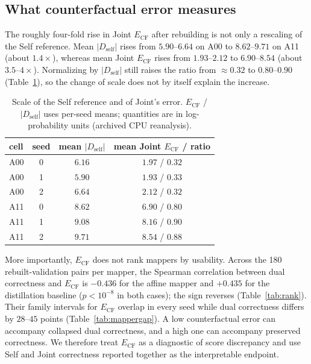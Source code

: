 \documentclass[11pt,twocolumn]{article}
\begin{document}
\subsection{What counterfactual error measures}
\label{sec:metricvalid}

The roughly four-fold rise in Joint $E_{\mathrm{CF}}$ after rebuilding is not
only a rescaling of the Self reference. Mean $|D_{\mathrm{self}}|$ rises from
$5.90$--$6.64$ on A00 to $8.62$--$9.71$ on A11 (about $1.4\times$), whereas mean
Joint $E_{\mathrm{CF}}$ rises from $1.93$--$2.12$ to $6.90$--$8.54$ (about
$3.5$--$4\times$). Normalizing by $|D_{\mathrm{self}}|$ still raises the ratio
from $\approx0.32$ to $0.80$--$0.90$ (Table~\ref{tab:scale}), so the change of
scale does not by itself explain the increase.

\begin{table}[t]
\centering
\caption{Scale of the Self reference and of Joint's error. $E_{\mathrm{CF}}$ /
$|D_{\mathrm{self}}|$ uses per-seed means; quantities are in log-probability
units (archived CPU reanalysis).}
\label{tab:scale}
\begin{tabular}{lccc}
\toprule
cell & seed & mean $|D_{\mathrm{self}}|$ & mean Joint $E_{\mathrm{CF}}$ / ratio \\
\midrule
A00 & 0 & $6.16$ & $1.97$ / $0.32$ \\
A00 & 1 & $5.90$ & $1.93$ / $0.33$ \\
A00 & 2 & $6.64$ & $2.12$ / $0.32$ \\
A11 & 0 & $8.62$ & $6.90$ / $0.80$ \\
A11 & 1 & $9.08$ & $8.16$ / $0.90$ \\
A11 & 2 & $9.71$ & $8.54$ / $0.88$ \\
\bottomrule
\end{tabular}
\end{table}

More importantly, $E_{\mathrm{CF}}$ does not rank mappers by usability. Across
the 180 rebuilt-validation pairs per mapper, the Spearman correlation between
dual correctness and $E_{\mathrm{CF}}$ is $-0.436$ for the affine mapper and
$+0.435$ for the distillation baseline ($p<10^{-8}$ in both cases); the sign
reverses (Table~\ref{tab:rank}). Their family intervals for $E_{\mathrm{CF}}$
overlap in every seed while dual correctness differs by $28$--$45$ points
(Table~\ref{tab:mappergap}). A low counterfactual error can accompany collapsed
dual correctness, and a high one can accompany preserved correctness. We
therefore treat $E_{\mathrm{CF}}$ as a diagnostic of score discrepancy and use
Self and Joint correctness reported together as the interpretable endpoint.
\end{document}
